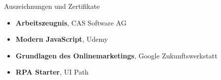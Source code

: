 \documentclass{resume} %
\begin{document}
\begin{rSection}{Auszeichnungen und Zertifikate}
    \begin{itemize}
        \item \textbf{Arbeitszeugnis}, CAS Software AG
        \item \textbf{Modern JavaScript}, Udemy
        \item \textbf{Grundlagen des Onlinemarketings}, Google Zukunftswerkstatt
        \item \textbf{RPA Starter}, UI Path
    \end{itemize}


\end{rSection}
\end{document}
